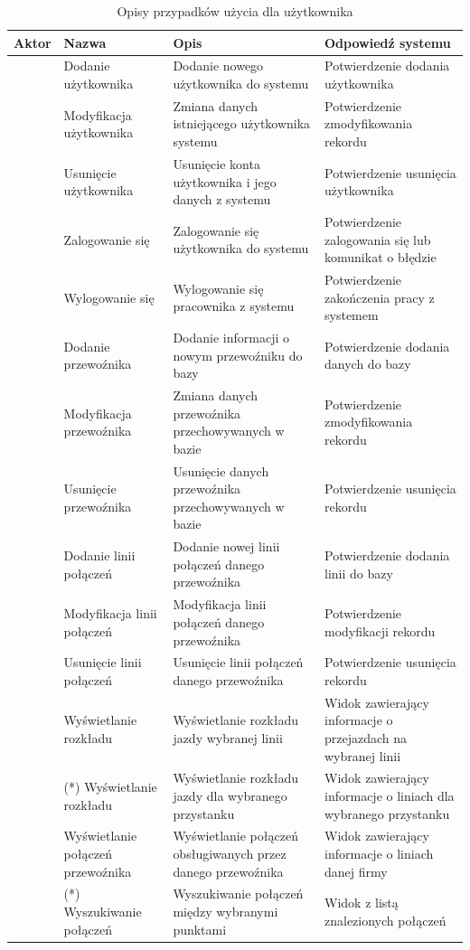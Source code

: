 \documentclass[10pt,a4paper]{article}
\begin{document}
\begin{table}[H]
	\begin{tabularx}{\textwidth}{|c|X|X|X|}
		\hline
		\textbf{Aktor} & \textbf{Nazwa} & \textbf{Opis} & \textbf{Odpowiedź systemu} \\
		\hline
		\multirow{6}{*}{\rotatebox[origin=c]{90}{Administrator}}
		& Dodanie użytkownika
		& Dodanie nowego użytkownika do systemu
		& Potwierdzenie dodania użytkownika \\
		\cline {2-4}
		& Modyfikacja użytkownika
		& Zmiana danych istniejącego użytkownika systemu
		& Potwierdzenie zmodyfikowania rekordu \\
		\cline{2-4}
		& Usunięcie użytkownika
		& Usunięcie konta użytkownika i jego danych z systemu
		& Potwierdzenie usunięcia użytkownika \\
		\hline
		\multirow{26}{*}{\rotatebox[origin=c]{90}{Pracownik}}
		& Zalogowanie się 
		& Zalogowanie się użytkownika do systemu
		& Potwierdzenie zalogowania się lub komunikat o błędzie \\
		\cline{2-4}
		& Wylogowanie się
		& Wylogowanie się pracownika z systemu
		& Potwierdzenie zakończenia pracy z systemem \\
		\cline{2-4}
		& Dodanie przewoźnika
		& Dodanie informacji o nowym przewoźniku do bazy
		& Potwierdzenie dodania danych do bazy \\
		\cline{2-4}
		& Modyfikacja przewoźnika
		& Zmiana danych przewoźnika przechowywanych w bazie
		& Potwierdzenie zmodyfikowania rekordu \\
		\cline{2-4}
		& Usunięcie przewoźnika
		& Usunięcie danych przewoźnika przechowywanych w bazie
		& Potwierdzenie usunięcia rekordu \\
		\cline{2-4}
		& Dodanie linii połączeń
		& Dodanie nowej linii połączeń danego przewoźnika
		& Potwierdzenie dodania linii do bazy \\
		\cline{2-4}
		& Modyfikacja linii połączeń
		& Modyfikacja linii połączeń danego przewoźnika
		& Potwierdzenie modyfikacji rekordu \\
		\cline{2-4}
		& Usunięcie linii połączeń
		& Usunięcie linii połączeń danego przewoźnika
		& Potwierdzenie usunięcia rekordu \\
		\cline{2-4}
		& Wyświetlanie rozkładu
		& Wyświetlanie rozkładu jazdy wybranej linii
		& Widok zawierający informacje o przejazdach na wybranej linii \\
		\cline{2-4}
		& (*) Wyświetlanie rozkładu
		& Wyświetlanie rozkładu jazdy dla wybranego przystanku
		& Widok zawierający informacje o liniach dla wybranego przystanku \\
		\cline{2-4}
		& Wyświetlanie połączeń przewoźnika
		& Wyświetlanie połączeń obsługiwanych przez danego przewoźnika
		& Widok zawierający informacje o liniach danej firmy \\
		\cline{2-4}
		& (*) Wyszukiwanie połączeń
		& Wyszukiwanie połączeń między wybranymi punktami
		& Widok z listą znalezionych połączeń \\
		\hline
	\end{tabularx}
	\caption{Opisy przypadków użycia dla użytkownika}
\end{table}
\end{document}
